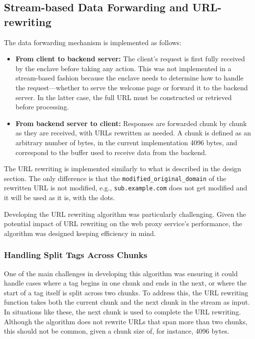 \subsection{Stream-based Data Forwarding and URL-rewriting}
The data forwarding mechanism is implemented as follows:

\begin{itemize}
    \item \textbf{From client to backend server:} The client's request is first fully received by the enclave before taking any action. This was not implemented in a stream-based fashion because the enclave needs to determine how to handle the request---whether to serve the welcome page or forward it to the backend server. In the latter case, the full URL must be constructed or retrieved before processing.
    
    \item \textbf{From backend server to client:} Responses are forwarded chunk by chunk as they are received, with URLs rewritten as needed. A chunk is defined as an arbitrary number of bytes, in the current implementation 4096 bytes, and correspond to the buffer used to receive data from the backend.
\end{itemize}

The URL rewriting is implemented similarly to what is described in the design section. The only difference is that the \texttt{modified\_original\_domain} of the rewritten URL is not modified, e.g., \texttt{sub.example.com} does not get modified and it will be used as it is, with the dots. 

Developing the URL rewriting algorithm was particularly challenging. Given the potential impact of URL rewriting on the web proxy service's performance, the algorithm was designed keeping efficiency in mind.

\subsubsection{Handling Split Tags Across Chunks}
One of the main challenges in developing this algorithm was ensuring it could handle cases where a tag begins in one chunk and ends in the next, or where the start of a tag itself is split across two chunks. To address this, the URL rewriting function takes both the current chunk and the next chunk in the stream as input. In situations like these, the next chunk is used to complete the URL rewriting. Although the algorithm does not rewrite URLs that span more than two chunks, this should not be common, given a chunk size of, for instance, 4096 bytes.

